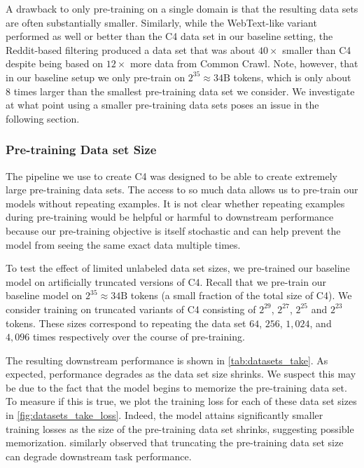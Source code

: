 A drawback to only pre-training on a single domain is that the resulting data sets are often substantially smaller. Similarly, while the WebText-like variant performed as well or better than the C4 data set in our baseline setting, the Reddit-based filtering produced a data set that was about $40\times$ smaller than C4 despite being based on $12\times$ more data from Common Crawl. Note, however, that in our baseline setup we only pre-train on $2^{35} \approx 34\mathrm{B}$ tokens, which is only about $8$ times larger than the smallest pre-training data set we consider. We investigate at what point using a smaller pre-training data sets poses an issue in the following section.

\subsubsection{Pre-training Data set Size}
\label{sec:datasets_take}

The pipeline we use to create C4 was designed to be able to create extremely large pre-training data sets. The access to so much data allows us to pre-train our models without repeating examples. It is not clear whether repeating examples during pre-training would be helpful or harmful to downstream performance because our pre-training objective is itself stochastic and can help prevent the model from seeing the same exact data multiple times.

To test the effect of limited unlabeled data set sizes, we pre-trained our baseline model on artificially truncated versions of C4. Recall that we pre-train our baseline model on $2^{35} \approx 34\mathrm{B}$ tokens (a small fraction of the total size of C4). We consider training on truncated variants of C4 consisting of $2^{29}$, $2^{27}$, $2^{25}$ and $2^{23}$ tokens. These sizes correspond to repeating the data set $64$, $256$, $1{,}024$, and $4{,}096$ times respectively over the course of pre-training.

The resulting downstream performance is shown in \ref{tab:datasets_take}.
As expected, performance degrades as the data set size shrinks. We suspect this may be due to the fact that the model begins to memorize the pre-training data set. To measure if this is true, we plot the training loss for each of these data set sizes in \ref{fig:datasets_take_loss}.
Indeed, the model attains significantly smaller training losses as the size of the pre-training data set shrinks, suggesting possible memorization.
\citet{baevski2019cloze} similarly observed that truncating the pre-training data set size can degrade downstream task performance.

